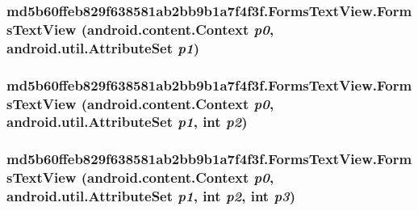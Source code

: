 \hypertarget{classmd5b60ffeb829f638581ab2bb9b1a7f4f3f_1_1_forms_text_view_7d3c80cbb7333b06cbafacf194ac26ec}{
\subsubsection[{FormsTextView}]{\setlength{\rightskip}{0pt plus 5cm}md5b60ffeb829f638581ab2bb9b1a7f4f3f.FormsTextView.FormsTextView (android.content.Context {\em p0}, \/  android.util.AttributeSet {\em p1})}}
\label{classmd5b60ffeb829f638581ab2bb9b1a7f4f3f_1_1_forms_text_view_7d3c80cbb7333b06cbafacf194ac26ec}


\hypertarget{classmd5b60ffeb829f638581ab2bb9b1a7f4f3f_1_1_forms_text_view_9cd58a7bb5d5ce0c7076ae35404b2138}{
\subsubsection[{FormsTextView}]{\setlength{\rightskip}{0pt plus 5cm}md5b60ffeb829f638581ab2bb9b1a7f4f3f.FormsTextView.FormsTextView (android.content.Context {\em p0}, \/  android.util.AttributeSet {\em p1}, \/  int {\em p2})}}
\label{classmd5b60ffeb829f638581ab2bb9b1a7f4f3f_1_1_forms_text_view_9cd58a7bb5d5ce0c7076ae35404b2138}


\hypertarget{classmd5b60ffeb829f638581ab2bb9b1a7f4f3f_1_1_forms_text_view_2900a37d92cd0ef85a4290ae3b6bf3d9}{
\subsubsection[{FormsTextView}]{\setlength{\rightskip}{0pt plus 5cm}md5b60ffeb829f638581ab2bb9b1a7f4f3f.FormsTextView.FormsTextView (android.content.Context {\em p0}, \/  android.util.AttributeSet {\em p1}, \/  int {\em p2}, \/  int {\em p3})}}
\label{classmd5b60ffeb829f638581ab2bb9b1a7f4f3f_1_1_forms_text_view_2900a37d92cd0ef85a4290ae3b6bf3d9}




